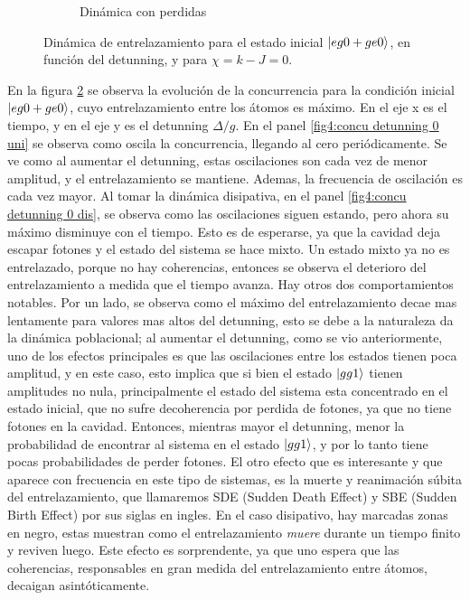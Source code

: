 \begin{figure}[h]
\begin{subfigure}{0.49\textwidth}
        \caption{Dinámica con perdidas}
        \label{fig4:concu x 0 dis}
    \end{subfigure}
    \caption{Dinámica de entrelazamiento para el estado inicial $\ket{eg0+ge0}$, en función del detunning, y para $\chi=k-J=0$.}
    \label{fig4:concu x 0}
\end{figure}
En la figura \ref{fig4:concu x 0} se observa la evolución de la concurrencia para la condición inicial $\ket{eg0+ge0}$, cuyo entrelazamiento entre los átomos es máximo. En el eje x es el tiempo, y en el eje y es el detunning $\Delta/g$. En el panel \ref{fig4:concu detunning 0 uni} se observa como oscila la concurrencia, llegando al cero periódicamente. Se ve como al aumentar el detunning, estas oscilaciones son cada vez de menor amplitud, y el entrelazamiento se mantiene. Ademas, la frecuencia de oscilación es cada vez mayor. Al tomar la dinámica disipativa, en el panel \ref{fig4:concu detunning 0 dis}, se observa como las oscilaciones siguen estando, pero ahora su máximo disminuye con el tiempo. Esto es de esperarse, ya que la cavidad deja escapar fotones y el estado del sistema se hace mixto. Un estado mixto ya no es entrelazado, porque no hay coherencias, entonces se observa el deterioro del entrelazamiento a medida que el tiempo avanza. Hay otros dos comportamientos notables. Por un lado, se observa como el máximo del entrelazamiento decae mas lentamente para valores mas altos del detunning, esto se debe a la naturaleza da la dinámica poblacional; al aumentar el detunning, como se vio anteriormente, uno de los efectos principales es que las oscilaciones entre los estados tienen poca amplitud, y en este caso, esto implica que si bien el estado $\ket{gg1}$ tienen amplitudes no nula, principalmente el estado del sistema esta concentrado en el estado inicial, que no sufre decoherencia por perdida de fotones, ya que no tiene fotones en la cavidad. Entonces, mientras mayor el detunning, menor la probabilidad de encontrar al sistema en el estado $\ket{gg1}$, y por lo tanto tiene pocas probabilidades de perder fotones. El otro efecto que es interesante y que aparece con frecuencia en este tipo de sistemas, es la muerte y reanimación súbita del entrelazamiento, que llamaremos SDE (Sudden Death Effect) y SBE (Sudden Birth Effect) por sus siglas en ingles. En el caso disipativo, hay marcadas zonas en negro, estas muestran como el entrelazamiento \textit{muere} durante un tiempo finito y reviven luego. Este efecto es sorprendente, ya que uno espera que las coherencias, responsables en gran medida del entrelazamiento entre átomos, decaigan asintóticamente. 

